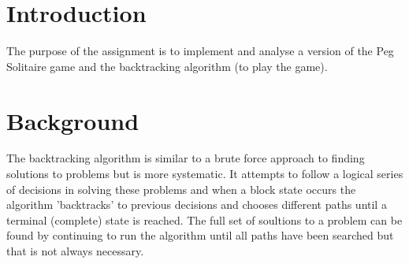\documentclass[a4paper]{article}
\begin{document}
\begin{titlepage}

 

\vfill %

\end{titlepage}

\clearpage
\setcounter{page}{1}



\section{Introduction}
The purpose of the assignment is to implement and analyse a version of the Peg Solitaire game and the backtracking algorithm (to play the game).

\section{Background}
The backtracking algorithm is similar to a brute force approach to finding solutions to problems but is more systematic. It attempts to follow a logical series of decisions in solving these problems and when a block state occurs the algorithm 'backtracks' to previous decisions and chooses different paths until a terminal (complete) state is reached. The full set of soultions to a problem can be found by continuing to run the algorithm until all paths have been searched but that is not always necessary.
\end{document}
